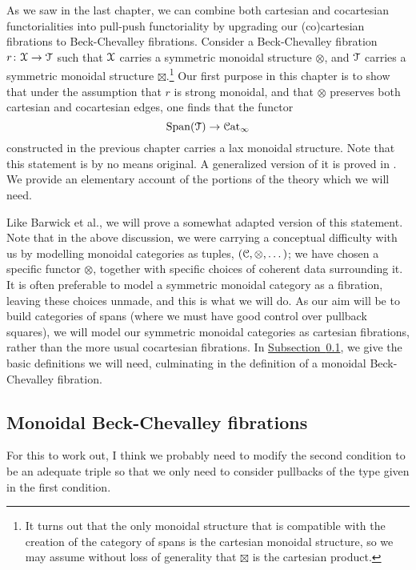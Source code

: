 \documentclass[main.tex]{subfiles}
\begin{document}
As we saw in the last chapter, we can combine both cartesian and cocartesian functorialities into pull-push functoriality by upgrading our (co)cartesian fibrations to Beck-Chevalley fibrations. Consider a Beck-Chevalley fibration $r\colon \mathcal{X} \to \mathcal{T}$ such that $\mathcal{X}$ carries a symmetric monoidal structure $\otimes$, and $\mathcal{T}$ carries a symmetric monoidal structure $\boxtimes$.\footnote{It turns out that the only monoidal structure that is compatible with the creation of the category of spans is the cartesian monoidal structure, so we may assume without loss of generality that $\boxtimes$ is the cartesian product.} Our first purpose in this chapter is to show that under the assumption that $r$ is strong monoidal, and that $\otimes$ preserves both cartesian and cocartesian edges, one finds that the functor
\begin{equation*}
  \mathrm{Span}(\mathcal{T}) \to \mathcal{C}\mathrm{at}_{\infty}
\end{equation*}
constructed in the previous chapter carries a lax monoidal structure. Note that this statement is by no means original. A generalized version of it is proved in \cite{spectralmackeyfunctors2}. We provide an elementary account of the portions of the theory which we will need.

Like Barwick et al., we will prove a somewhat adapted version of this statement. Note that in the above discussion, we were carrying a conceptual difficulty with us by modelling monoidal categories as tuples, $(\mathcal{C}, \otimes, \dots)$; we have chosen a specific functor $\otimes$, together with specific choices of coherent data surrounding it. It is often preferable to model a symmetric monoidal category as a fibration, leaving these choices unmade, and this is what we will do. As our aim will be to build categories of spans (where we must have good control over pullback squares), we will model our symmetric monoidal categories as cartesian fibrations, rather than the more usual cocartesian fibrations. In \hyperref[ssc:monoidal_beck_chevalley_fibrations]{Subsection~\ref*{ssc:monoidal_beck_chevalley_fibrations}}, we give the basic definitions we will need, culminating in the definition of a monoidal Beck-Chevalley fibration.


\subsection{Monoidal Beck-Chevalley fibrations}
\label{ssc:monoidal_beck_chevalley_fibrations}

\begin{note}
  For this to work out, I think we probably need to modify the second condition to be an adequate triple so that we only need to consider pullbacks of the type given in the first condition.
\end{note}
\end{document}

